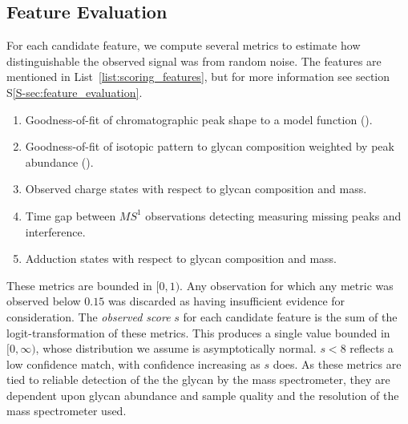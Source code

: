 \subsection{Feature Evaluation}
        For each candidate feature, we compute several metrics to estimate
    how distinguishable the observed signal was from random noise. The
    features are mentioned in List~\ref{list:scoring_features}, but for more
    information see section S\ref{S-sec:feature_evaluation}.

    \begin{ordlist}
    \begin{enumerate}
        \itemsep0em
        \caption{Chromatographic Feature Metrics\label{list:scoring_features}}
        \item Goodness-of-fit of chromatographic peak shape to a model function
              (\cite{Yu2010,Kronewitter2014,}).
        \item Goodness-of-fit of isotopic pattern to glycan composition weighted
              by peak abundance (\cite{Maxwell2012}).
        \item Observed charge states with respect to glycan composition and mass.
        \item Time gap between $MS^1$ observations detecting measuring missing peaks
              and interference.
        \item Adduction states with respect to glycan composition and mass.
    \end{enumerate}
    \end{ordlist}

        These metrics are bounded in $[0, 1)$. Any observation for which any metric
    was observed below $0.15$ was discarded as having insufficient evidence for
    consideration. The \textit{observed score} $s$ for each candidate feature is
    the sum of the logit-transformation of these metrics. This produces a single
    value bounded in $[0, \infty)$, whose distribution we assume is asymptotically
    normal. $s < 8$ reflects a low confidence match, with confidence increasing
    as $s$ does. As these metrics are tied to reliable detection of the the glycan
    by the mass spectrometer, they are dependent upon glycan abundance and sample
    quality and the resolution of the mass spectrometer used.
